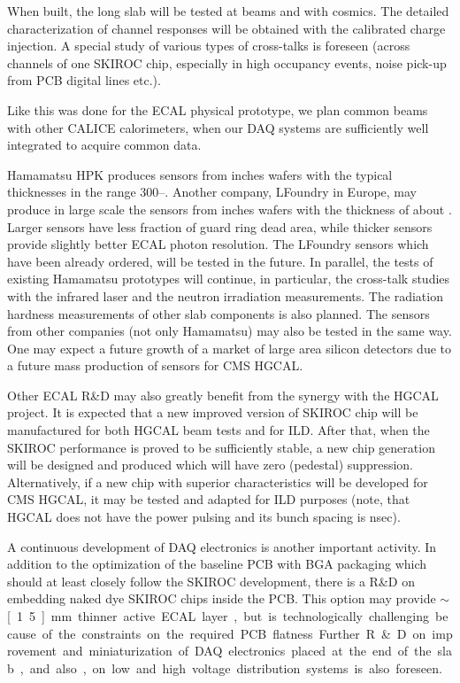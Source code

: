 When built, the long slab will be tested at beams and with cosmics. The
detailed characterization of channel responses will be obtained with the
calibrated charge injection. A special study of various types of cross-talks
is foreseen (across channels of one SKIROC chip, especially in high occupancy
events, noise pick-up from PCB digital lines etc.).

Like this was done for the ECAL physical prototype, we plan common beams with
other CALICE calorimeters, when our DAQ systems are sufficiently well
integrated to acquire common data.

Hamamatsu HPK produces sensors from \unit[6]{inches} wafers with the typical
thicknesses in the range 300--\unit[500]{\micron}. Another company, LFoundry in Europe,
may produce in large scale the sensors from \unit[8]{inches} wafers with the thickness
of about \unit[700]{\micron}. Larger sensors have less fraction of guard ring dead
area, while thicker sensors provide slightly better ECAL photon
resolution. The LFoundry sensors which have been already ordered, will be
tested in the future. In parallel, the tests of existing Hamamatsu prototypes
will continue, in particular, the cross-talk studies with the infrared laser
and the neutron irradiation measurements. The radiation hardness measurements
of other slab components is also planned. The sensors from other companies
(not only Hamamatsu) may also be tested in the same way. One may expect a
future growth of a market of large area silicon detectors due to a future mass
production of sensors for CMS HGCAL.

Other ECAL R\&D may also greatly benefit from the synergy with the HGCAL
project. It is expected that a new improved version of SKIROC chip will be
manufactured for both HGCAL beam tests and for ILD. After that, when the
SKIROC performance is proved to be sufficiently stable, a new chip generation
will be designed and produced which will have zero (pedestal) suppression.
Alternatively, if a new chip with superior characteristics will be developed
for CMS HGCAL, it may be tested and adapted for ILD purposes (note, that HGCAL
does not have the power pulsing and its bunch spacing is \unit[25]{nsec}).

A continuous development of DAQ electronics is another important
activity. In addition to the optimization of the baseline PCB with BGA
packaging which should at least closely follow the SKIROC development, there
is a R\&D on embedding naked dye SKIROC chips inside the PCB. This option may
provide $\sim$\unit[1.5]{mm} thinner active ECAL layer, but is technologically
challenging because of the constraints on the required PCB flatness. Further
R\&D on improvement and miniaturization of DAQ electronics placed at the end
of the slab, and also, on low and high voltage distribution systems is also
foreseen.

